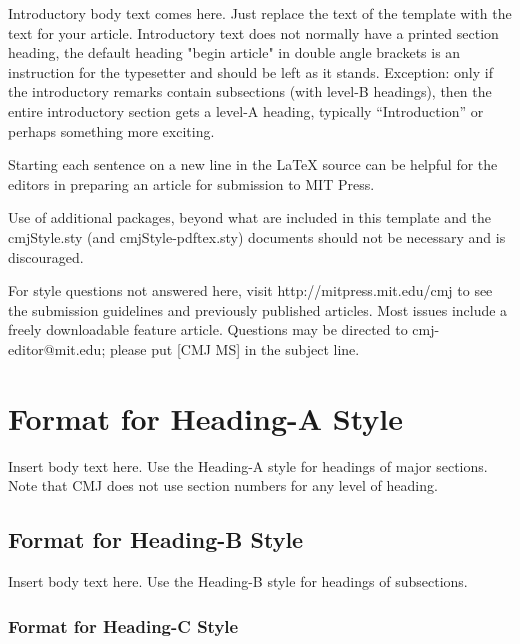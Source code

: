 \documentclass[letterpaper, 12pt]{article}
\begin{document}


Introductory body text comes here. 
Just replace the text of the template with the text for your article.
Introductory text does not normally have a printed section heading, the default heading "begin article" in double angle brackets is an instruction for the typesetter and should be left as it stands.
Exception: only if the introductory remarks contain subsections (with level-B headings), then the entire introductory section gets a level-A heading, typically ``Introduction'' or perhaps something more exciting.

Starting each sentence on a new line in the LaTeX source can be helpful for the editors in preparing an article for submission to MIT Press.

Use of additional packages, beyond what are included in this template and the cmjStyle.sty (and cmjStyle-pdftex.sty) documents should not be necessary and is discouraged. 

For style questions not answered here, visit http://mitpress.mit.edu/cmj to see the submission guidelines and previously published articles.  
Most issues include a freely downloadable feature article.  
Questions may be directed to cmj-editor@mit.edu; please put [CMJ MS] in the subject line.

\parskip 18pt

%
\section{Format for Heading-A Style}

Insert body text here.  
Use the Heading-A style for headings of major sections.
Note that CMJ does not use section numbers for any level of heading.

\vspace*{24pt}

\subsection{Format for Heading-B Style}

Insert body text here.  
Use the Heading-B style for headings of subsections.

\subsubsection{Format for Heading-C Style}
\end{document}
